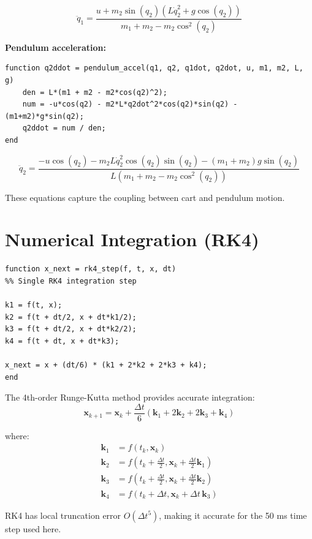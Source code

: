 \documentclass[11pt]{article}
\begin{document}
\[
\ddot{q}_1 = \frac{u + m_2 \sin(q_2) \left( L \dot{q}_2^2 + g \cos(q_2) \right)}{m_1 + m_2 - m_2 \cos^2(q_2)}
\]

\textbf{Pendulum acceleration:}
\begin{lstlisting}
function q2ddot = pendulum_accel(q1, q2, q1dot, q2dot, u, m1, m2, L, g)
    den = L*(m1 + m2 - m2*cos(q2)^2);
    num = -u*cos(q2) - m2*L*q2dot^2*cos(q2)*sin(q2) - (m1+m2)*g*sin(q2);
    q2ddot = num / den;
end
\end{lstlisting}

\[
\ddot{q}_2 = \frac{-u \cos(q_2) - m_2 L \dot{q}_2^2 \cos(q_2) \sin(q_2) - (m_1 + m_2) g \sin(q_2)}{L (m_1 + m_2 - m_2 \cos^2(q_2))}
\]

These equations capture the coupling between cart and pendulum motion.

\section{Numerical Integration (RK4)}

\begin{lstlisting}
function x_next = rk4_step(f, t, x, dt)
%% Single RK4 integration step

k1 = f(t, x);
k2 = f(t + dt/2, x + dt*k1/2);
k3 = f(t + dt/2, x + dt*k2/2);
k4 = f(t + dt, x + dt*k3);

x_next = x + (dt/6) * (k1 + 2*k2 + 2*k3 + k4);
end
\end{lstlisting}

The 4th-order Runge-Kutta method provides accurate integration:
\[
\mathbf{x}_{k+1} = \mathbf{x}_k + \frac{\Delta t}{6} \left( \mathbf{k}_1 + 2\mathbf{k}_2 + 2\mathbf{k}_3 + \mathbf{k}_4 \right)
\]

where:
\begin{align*}
\mathbf{k}_1 &= f(t_k, \mathbf{x}_k) \\
\mathbf{k}_2 &= f(t_k + \tfrac{\Delta t}{2}, \mathbf{x}_k + \tfrac{\Delta t}{2} \mathbf{k}_1) \\
\mathbf{k}_3 &= f(t_k + \tfrac{\Delta t}{2}, \mathbf{x}_k + \tfrac{\Delta t}{2} \mathbf{k}_2) \\
\mathbf{k}_4 &= f(t_k + \Delta t, \mathbf{x}_k + \Delta t \, \mathbf{k}_3)
\end{align*}

RK4 has local truncation error $O(\Delta t^5)$, making it accurate for the 50 ms time step used here.
\end{document}
